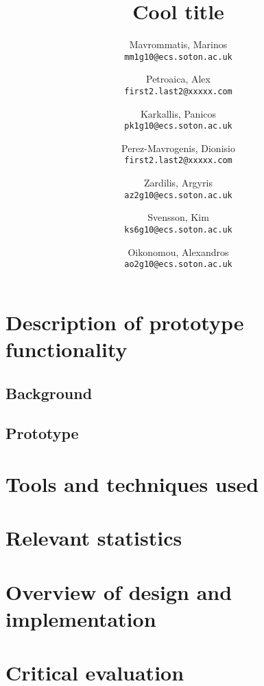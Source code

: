 \documentclass[12pt,a4paper,titlepage]{article}
\author{
  Mavrommatis, Marinos\\ 
\texttt{mm1g10@ecs.soton.ac.uk}
\and
Petroaica, Alex\\ 
\texttt{first2.last2@xxxxx.com}
\and
Karkallis, Panicos\\ 
\texttt{pk1g10@ecs.soton.ac.uk}
\and
Perez-Mavrogenis, Dionisio\\
 \texttt{first2.last2@xxxxx.com}
\and
Zardilis, Argyris\\
 \texttt{az2g10@ecs.soton.ac.uk}
\and
Svensson, Kim\\
 \texttt{ks6g10@ecs.soton.ac.uk}
\and
Oikonomou, Alexandros\\
 \texttt{ao2g10@ecs.soton.ac.uk}
}
\title{Cool title}
\begin{document}
\maketitle

\section{Description of prototype functionality}
\subsection{Background}
\subsection{Prototype}
\section{Tools and techniques used}
\section{Relevant statistics}
\section{Overview of design and implementation}
\section{Critical evaluation}
\end{document}
